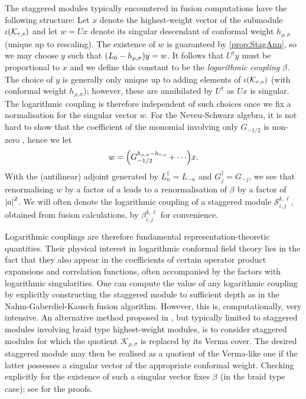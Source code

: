 \documentclass[a4paper,reqno,12pt]{report}
\theoremstyle{definition}
\numberwithin{equation}{section}
\let\originalleft\left     %
\let\originalright\right
\renewcommand{\left}{\mathopen{}\mathclose\bgroup\originalleft}
\renewcommand{\right}{\aftergroup\egroup\originalright}
\newcommand{\func}[2]{#1 \left( #2 \right)} %
\newcommand{\brac}[1]{\left( #1 \right)}
\newcommand{\abs}[1]{\left\lvert #1 \right\rvert}
\newcommand{\Kac}[1]{\mathcal{K}_{#1}}       %
\newcommand{\Stag}[2]{\mathcal{S}_{#1}^{#2}} %
\newcommand{\logcoup}[2]{\beta_{#1}^{#2}}    %
\newcommand{\lcft}{logarithmic conformal field theory}
\newcommand{\opes}{operator product expansions}
\newcommand{\hw}{highest-weight}
\newcommand{\hws}{\hw{} vector}
\newcommand{\sv}{singular vector}
\newcommand{\hwms}{\hw{} modules}
\newcommand{\NGK}{Nahm-Gaberdiel-Kausch}
\newcommand{\ns}{Neveu-Schwarz}
\theoremstyle{plain}
\begin{document}
The staggered modules typically encountered in fusion computations have the following structure:  Let $x$ denote the \hws{} of the submodule $\func{\iota}{\Kac{r,s}}$ and let $w = Ux$ denote its singular descendant of conformal weight $h_{\rho,\sigma}$ (unique up to rescaling).  The existence of $w$ is guaranteed by \cref{prop:StagAnn}, so we may choose $y$ such that $\brac{L_0 - h_{\rho,\sigma}} y = w$.  It follows that $U^{\dag} y$ must be proportional to $x$ and we define \cite{RidPer07} this constant to be the \emph{logarithmic coupling} $\logcoup{}{}$.  The choice of $y$ is generally only unique up to adding elements of $\func{\iota}{\Kac{r,s}}$ (with conformal weight $h_{\rho,\sigma}$); however, these are annihilated by $U^{\dag}$ as $Ux$ is singular.  The logarithmic coupling is therefore independent of such choices once we fix a normalisation for the \sv{} $w$.  For the \ns{} algebra, it is not hard to show that the coefficient of the monomial involving only $G_{-1/2}$ is non-zero \cite{AstStr97}, hence we let
\begin{equation} \label{eq:LogCoupNorm}
w = \brac{G_{-1/2}^{h_{\rho,\sigma} - h_{r,s}} + \cdots} x.
\end{equation}
With the (antilinear) adjoint generated by $L_n^{\dag} = L_{-n}$ and $G_j^{\dag} = G_{-j}$, we see that renormalising $w$ by a factor of $a$ leads to a renormalisation of $\logcoup{}{}$ by a factor of $\abs{a}^2$.  We will often denote the logarithmic coupling of a staggered module $\Stag{i,j}{k,\ell}$, obtained from fusion calculations, by $\logcoup{i,j}{k,\ell}$ for convenience.

Logarithmic couplings are therefore fundamental representation-theoretic quantities.  Their physical interest in \lcft{} lies in the fact that they also appear in the coefficients of certain \opes{} and correlation functions, often accompanied by the factors with logarithmic singularities.  One can compute the value of any logarithmic coupling by explicitly constructing the staggered module to sufficient depth as in the \NGK{} fusion algorithm.  However, this is, computationally, very intensive.  An alternative method proposed in \cite{RidLog07}, but typically limited to staggered modules involving braid type \hwms{}, is to consider staggered modules for which the quotient $\Kac{\rho,\sigma}$ is replaced by its Verma cover.  The desired staggered module may then be realised as a quotient of the Verma-like one if the latter possesses a \sv{} of the appropriate conformal weight.  Checking explicitly for the existence of such a \sv{} fixes $\logcoup{}{}$ (in the braid type case); see \cite{RidSta09} for the proofs.
\end{document}
